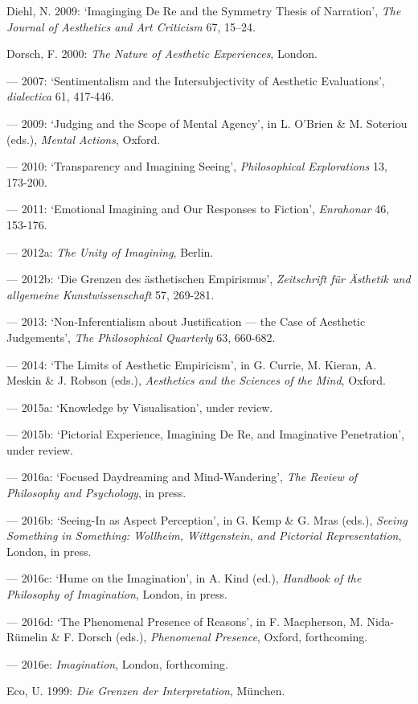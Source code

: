 \begin{hangparas}{.5cm}{1}
Diehl, N. 2009: `Imaginging De Re and the Symmetry Thesis of Narration', \emph{The Journal of Aesthetics and Art Criticism} 67, 15--24.

Dorsch, F. 2000: \emph{The Nature of Aesthetic Experiences}, London.
 
--- 2007: `Sentimentalism and the Intersubjectivity of Aesthetic Evaluations', \emph{dialectica} 61, 417-446. 
 
--- 2009: `Judging and the Scope of Mental Agency', in L. O'Brien \& M. Soteriou (eds.), \emph{Mental Actions}, Oxford. 
 
--- 2010: `Transparency and Imagining Seeing', \emph{Philosophical Explorations} 13, 173-200. 
 
--- 2011: `Emotional Imagining and Our Responses to Fiction', \emph{Enrahonar} 46, 153-176. 
 
--- 2012a: \emph{The Unity of Imagining}, Berlin.

--- 2012b: `Die Grenzen des \"asthetischen Empirismus', \emph{Zeitschrift f\"ur \"Asthetik und allgemeine Kunstwissenschaft} 57, 269-281.
 
--- 2013: `Non-Inferentialism about Justification --- the Case of Aesthetic Judgements', \emph{The Philosophical Quarterly} 63, 660-682.

--- 2014: `The Limits of Aesthetic Empiricism', in G. Currie, M. Kieran, A. Meskin \& J. Robson (eds.), \emph{Aesthetics and the Sciences of the Mind}, Oxford. 

--- 2015a: `Knowledge by Visualisation', under review.

--- 2015b: `Pictorial Experience, Imagining De Re, and Imaginative Penetration', under review.

--- 2016a: `Focused Daydreaming and Mind-Wandering', \emph{The Review of Philosophy and Psychology}, in press.
 
--- 2016b: `Seeing-In as Aspect Perception', in G. Kemp \& G. Mras (eds.), \emph{Seeing Something in Something: Wollheim, Wittgenstein, and Pictorial Representation}, London, in press.

--- 2016c: `Hume on the Imagination', in A. Kind (ed.), \emph{Handbook of the Philosophy of Imagination}, London, in press.
 
--- 2016d: `The Phenomenal Presence of Reasons', in F. Macpherson, M. Nida-R\"umelin \& F. Dorsch (eds.), \emph{Phenomenal Presence}, Oxford, forthcoming. 
 
--- 2016e: \emph{Imagination}, London, forthcoming.

Eco, U. 1999: \emph{Die Grenzen der Interpretation}, M\"unchen. 


\end{hangparas}
